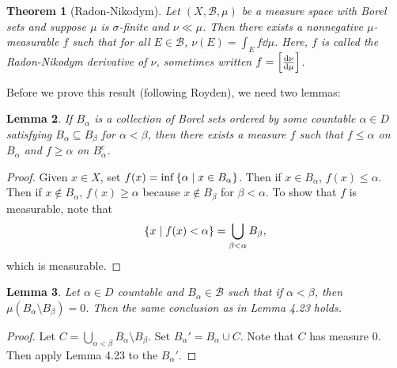 \documentclass[leqno, openany]{memoir}
\newtheorem{thm}{Theorem}[chapter]
\newtheorem{lem}[thm]{Lemma}
\theoremstyle{definition}
\theoremstyle{remark}
\theoremstyle{plain}
\theoremstyle{definition}
\theoremstyle{remark}
\newcommand{\mc}[1]{\mathcal{#1}}
\begin{document}
\begin{thm}[Radon-Nikodym] Let $(X, \mc{B}, \mu)$ be a measure space with Borel
    sets and suppose $\mu$ is $\sigma$-finite and $\nu \ll \mu$. Then there
    exists a nonnegative $\mu$-measurable $f$ such that for all $E \in \mc{B}$,
    $\nu(E) = \int_E f \dd{\mu}$. Here, $f$ is called the \textit{Radon-Nikodym
    derivative of $\nu$}, sometimes written $f = \qty[\dv{\nu}{\mu}]$.
\end{thm}

Before we prove this result (following Royden), we need two lemmas:

\begin{lem} If $B_{\alpha}$ is a collection of Borel sets ordered by some
    countable $\alpha \in D$ satisfying $B_{\alpha} \subseteq B_{\beta}$ for
    $\alpha < \beta$, then there exists a measure $f$ such that $f \leq \alpha$
    on $B_{\alpha}$ and $f \geq \alpha$ on $B_{\alpha}^c$.  \end{lem}

\begin{proof} Given $x \in X$, set $f(x) = \inf \qty{\alpha \mid x \in
    B_{\alpha}}$. Then if $x \in B_{\alpha}$, $f(x) \leq \alpha$. Then if $x
    \notin B_{\alpha}$, $f(x) \geq \alpha$ because $x \notin B_{\beta}$ for
    $\beta < \alpha$. To show that $f$ is measurable, note that \[ \qty{x \mid
    f(x) < \alpha} = \bigcup_{\beta < \alpha} B_{\beta}, \] which is
measurable.  \end{proof}

\begin{lem} Let $\alpha \in D$ countable and $B_{\alpha} \in \mc{B}$ such that
if $\alpha < \beta$, then $\mu(B_{\alpha} \setminus B_{\beta}) = 0$. Then the
same conclusion as in Lemma 4.23 holds.  \end{lem}

\begin{proof} Let $C = \bigcup_{\alpha < \beta} B_{\alpha} \setminus
B_{\beta}$. Set $B_{\alpha}' = B_{\alpha} \cup C$. Note that $C$ has measure
$0$. Then apply Lemma 4.23 to the $B_{\alpha}'$.  \end{proof}
\end{document}

